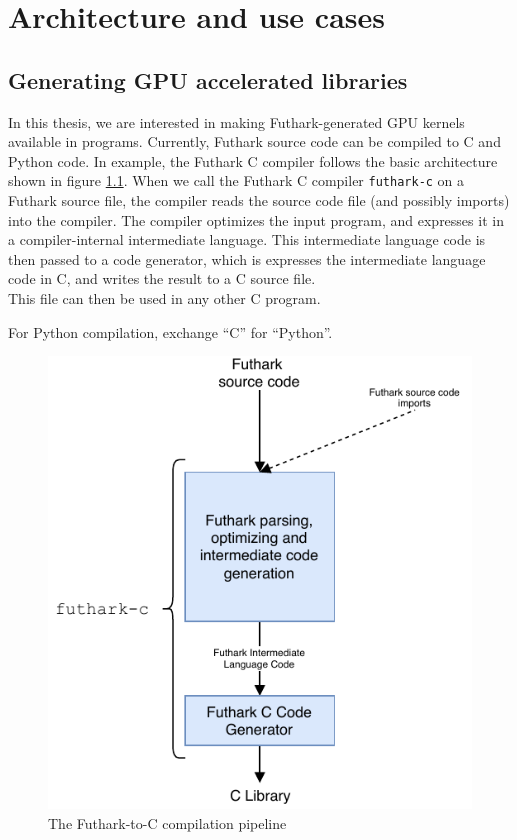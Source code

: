 \chapter{Architecture and use cases}

\section{Generating GPU accelerated libraries}
In this thesis, we are interested in making Futhark-generated GPU kernels available
in \csharp{} programs.
Currently, Futhark source code can be compiled to C and Python code.
In example, the Futhark C compiler follows the basic architecture shown in
figure \ref{fig:ccompiler}.
When we call the Futhark C compiler \texttt{futhark-c} on a Futhark source file, the compiler reads
the source code file (and possibly imports) into the compiler.
The compiler optimizes the input program, and expresses it in a
compiler-internal intermediate language. This intermediate language code is then
passed to a code generator, which is expresses the intermediate language code in
C, and writes the result to a C source file.\\
This file can then be used in any other C program.

For Python compilation, exchange ``C'' for ``Python''.

\begin{figure}[H]
  \centering
  \includegraphics{chapters/figs/architecture/ccompiler.pdf}
  \caption{The Futhark-to-C compilation pipeline}
  \label{fig:ccompiler}
\end{figure}

